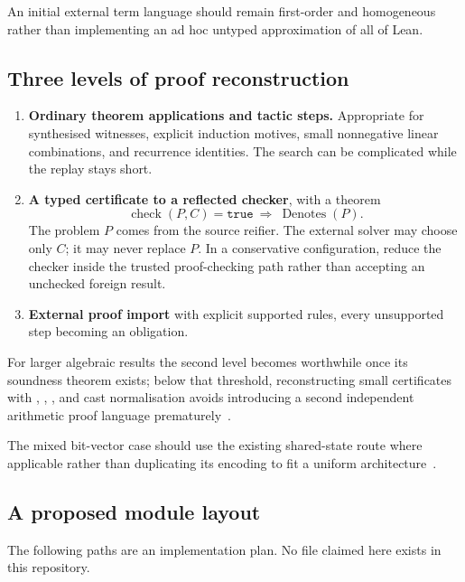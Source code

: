 An initial external term language should remain first-order and homogeneous
rather than implementing an ad hoc untyped approximation of all of Lean.

\subsection{Three levels of proof reconstruction}

\begin{enumerate}[leftmargin=1.4em]
\item \textbf{Ordinary theorem applications and tactic steps.} Appropriate for
  synthesised witnesses, explicit induction motives, small nonnegative linear
  combinations, and recurrence identities. The search can be complicated while
  the replay stays short.
\item \textbf{A typed certificate to a reflected checker}, with a theorem
  \[
  \operatorname{check}(P,C)=\texttt{true}\ \Longrightarrow\ \operatorname{Denotes}(P).
  \]
  The problem $P$ comes from the source reifier. The external solver may choose
  only $C$; it may never replace $P$. In a conservative configuration, reduce
  the checker inside the trusted proof-checking path rather than accepting an
  unchecked foreign result.
\item \textbf{External proof import} with explicit supported rules, every
  unsupported step becoming an obligation.
\end{enumerate}

For larger algebraic results the second level becomes worthwhile once its
soundness theorem exists; below that threshold, reconstructing small certificates
with , , ,  and cast
normalisation avoids introducing a second independent arithmetic proof language
prematurely~\cite{mathlib-ring,mathlib-linarith,mathlib-positivity,mathlib-linear-combination}.

The mixed bit-vector case should use the existing shared-state
 route where applicable rather than duplicating its
encoding to fit a uniform architecture~\cite{lean-release-434}.

\subsection{A proposed module layout}

The following paths are an implementation plan. No file claimed here exists in
this repository.


